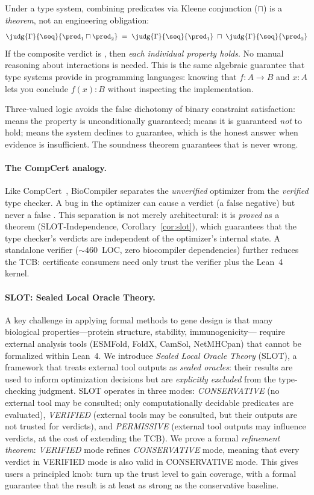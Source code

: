 \noindent Under a type system, combining predicates via Kleene
conjunction ($\sqcap$) is a \emph{theorem}, not an engineering
obligation:
\[
  \judg{\Gamma}{\seq}{\pred_1 \sqcap \pred_2}
  \;=\;
  \judg{\Gamma}{\seq}{\pred_1} \;\sqcap\;
  \judg{\Gamma}{\seq}{\pred_2}
\]
If the composite verdict is \PASS, then \emph{each individual property
holds}. No manual reasoning about interactions is needed. This is the
same algebraic guarantee that type systems provide in programming
languages: knowing that $f : A \to B$ and $x : A$ lets you conclude
$f(x) : B$ without inspecting the implementation.

Three-valued logic avoids the false dichotomy of binary constraint
satisfaction: \PASS{} means the property is unconditionally guaranteed;
\FAIL{} means it is guaranteed \emph{not} to hold; \UNCERTAIN{} means
the system declines to guarantee, which is the honest answer when
evidence is insufficient.
The soundness theorem guarantees that \PASS{} is never wrong.

\paragraph{The CompCert analogy.}
Like CompCert~\cite{leroy2009compcert}, BioCompiler separates the
\emph{unverified} optimizer from the \emph{verified} type checker.
A bug in the optimizer can cause a \FAIL{} verdict (a false negative)
but never a false \PASS.
This separation is not merely architectural: it is \emph{proved} as a
theorem (SLOT-Independence, Corollary~\ref{cor:slot}), which
guarantees that the type checker's verdicts are independent of the
optimizer's internal state.
A standalone verifier (${\sim}460$~LOC, zero biocompiler dependencies)
further reduces the TCB: certificate consumers need only trust the
verifier plus the Lean~4 kernel.

\paragraph{SLOT: Sealed Local Oracle Theory.}
A key challenge in applying formal methods to gene design is that many
biological properties---protein structure, stability, immunogenicity---
require external analysis tools (ESMFold, FoldX, CamSol, NetMHCpan)
that cannot be formalized within Lean~4.
We introduce \emph{Sealed Local Oracle Theory} (SLOT), a framework
that treats external tool outputs as \emph{sealed oracles}: their
results are used to inform optimization decisions but are
\emph{explicitly excluded} from the type-checking judgment.
SLOT operates in three modes:
\emph{CONSERVATIVE} (no external tool may be consulted; only
computationally decidable predicates are evaluated),
\emph{VERIFIED} (external tools may be consulted, but their outputs
are not trusted for \PASS{} verdicts), and
\emph{PERMISSIVE} (external tool outputs may influence verdicts, at
the cost of extending the TCB).
We prove a formal \emph{refinement theorem}:
\emph{VERIFIED} mode refines \emph{CONSERVATIVE} mode, meaning that
every \PASS{} verdict in VERIFIED mode is also valid in CONSERVATIVE
mode.
This gives users a principled knob: turn up the trust level to gain
coverage, with a formal guarantee that the result is at least as strong
as the conservative baseline.

